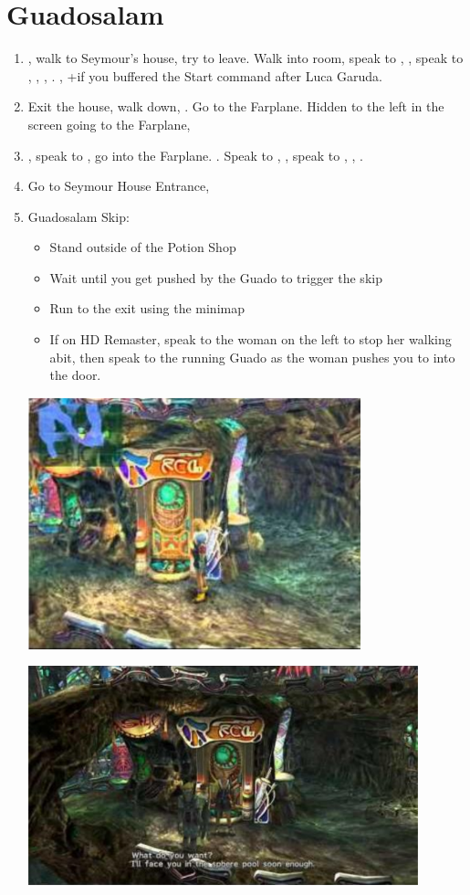 \chapter{Guadosalam}

\begin{enumerate}
	\item \sd, walk to Seymour's house, try to leave. Walk into room, speak to \auron, \sd, speak to \wakka, \lulu, \rikku, \yuna. \sd, \skippablefmv+\cs[5:50] if you buffered the Start command after Luca Garuda.
	\item Exit the house, walk down, \sd. Go to the Farplane. Hidden to the left in the screen going to the Farplane, 
	\item \sd, speak to \auron, go into the Farplane. \cs[1:20]. Speak to \wakka, \sd, speak to \yuna, \cs[2:10], \sd.
	\item Go to Seymour House Entrance, \sd
	\bothcb \wincb \losscb
	\item Guadosalam Skip:
	      \begin{itemize}
		      \item Stand outside of the Potion Shop
		      \item Wait until you get pushed by the Guado to trigger the skip
		      \item Run to the exit using the minimap
		      \item If on HD Remaster, speak to the woman on the left to stop her walking abit, then speak to the running Guado as the woman pushes you to into the door.
	      \end{itemize}
	      \includegraphics{graphics/guadoskipstandard}

	      \includegraphics{graphics/guadoskipremaster}
\end{enumerate}
